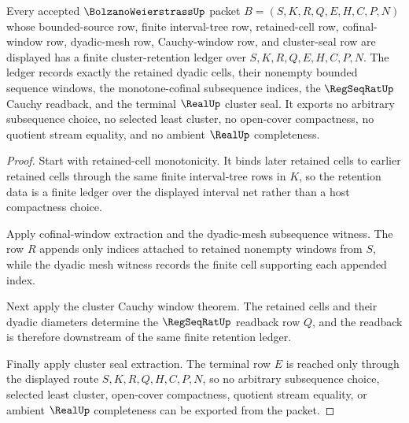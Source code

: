 \begin{theorem}
\label{thm:bolzano-weierstrass-finite-cluster-retention-ledger}
Every accepted $\BolzanoWeierstrassUp$ packet $B=(S,K,R,Q,E,H,C,P,N)$ whose bounded-source row, finite interval-tree row, retained-cell row, cofinal-window row, dyadic-mesh row, Cauchy-window row, and cluster-seal row are displayed has a finite cluster-retention ledger over $S,K,R,Q,E,H,C,P,N$. The ledger records exactly the retained dyadic cells, their nonempty bounded sequence windows, the monotone-cofinal subsequence indices, the $\RegSeqRatUp$ Cauchy readback, and the terminal $\RealUp$ cluster seal. It exports no arbitrary subsequence choice, no selected least cluster, no open-cover compactness, no quotient stream equality, and no ambient $\RealUp$ completeness.
\end{theorem}
\begin{proof}
Start with retained-cell monotonicity. It binds later retained cells to earlier retained cells through the same finite interval-tree rows in $K$, so the retention data is a finite ledger over the displayed interval net rather than a host compactness choice.

Apply cofinal-window extraction and the dyadic-mesh subsequence witness. The row $R$ appends only indices attached to retained nonempty windows from $S$, while the dyadic mesh witness records the finite cell supporting each appended index.

Next apply the cluster Cauchy window theorem. The retained cells and their dyadic diameters determine the $\RegSeqRatUp$ readback row $Q$, and the readback is therefore downstream of the same finite retention ledger.

Finally apply cluster seal extraction. The terminal row $E$ is reached only through the displayed route $S,K,R,Q,H,C,P,N$, so no arbitrary subsequence choice, selected least cluster, open-cover compactness, quotient stream equality, or ambient $\RealUp$ completeness can be exported from the packet.
\end{proof}

